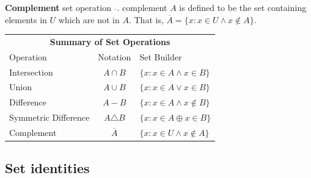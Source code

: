 \noindent \textbf{Complement} set operation $\overline{ }$.
complement $A$ is defined to be the set containing elements in $U$ which are not in $A$.
That is, $\overline{A}= \{x: x \in U \land x \not \in A\}$.
\begin{center}
\end{center}

\begin{center}
  \begin{tabular}{l|c|l}
    \multicolumn{3}{c}{\textbf{Summary of Set Operations}}                       \\
    Operation            & Notation        & Set Builder                         \\
    \hline
    Intersection         & $A \cap B$      & $\{x: x \in A \land x \in B\}$      \\
    Union                & $A \cup B$      & $\{x: x \in A \lor x \in B\}$       \\
    Difference           & $A - B$         & $\{x: x \in A \land x \not \in B\}$ \\
    Symmetric Difference & $A \triangle B$ & $\{x: x \in A \oplus  x \in B\}$    \\
    Complement           & $\overline{A}$  & $\{x: x \in U \land x \not \in A\}$ \\
  \end{tabular}
\end{center}

\subsection{Set identities}

